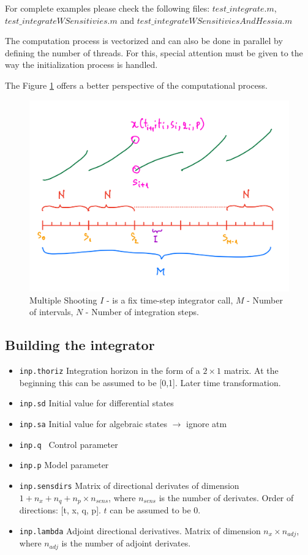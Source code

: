 \documentclass[12pt, letterpaper]{article}
\begin{document}
For complete examples please check the following files: $test\_integrate.m$, $test\_integrateWSensitivies.m$ and
$test\_integrateWSensitiviesAndHessia.m$

The computation process is vectorized and can also be done in parallel by defining the number of threads. For this, special attention must be given to the way the initialization process is handled.

The Figure \ref{multipleShootingImg} offers a better perspective of the computational process.

\begin{figure}[h!]
    \centering
    \includegraphics[scale=0.25]{images/multipleShooting.png}
    \caption{Multiple Shooting $I$ - is a fix time-step integrator call, $M$ - Number of intervals, $N$ - Number of integration steps.}
    \label{multipleShootingImg}
\end{figure}



\subsection{Building the integrator}

\begin{itemize}
    \item \texttt{inp.thoriz} Integration horizon in the form of a $2 \times 1$ matrix. At the beginning  this can be assumed to be [0,1]. Later time transformation.
    \item \texttt{inp.sd} Initial value for differential states 
    \item \texttt{inp.sa} Initial value for algebraic states $\rightarrow$ ignore atm
    \item \texttt{inp.q } Control parameter
    \item \texttt{inp.p} Model parameter
    \item \texttt{inp.sensdirs} Matrix of directional derivates of dimension $1+n_x+n_q+n_p \times n_{sens}$, where $n_{sens}$ is the number of derivates.
         Order of directions: [t, x, q, p]. $t$ can be assumed to be 0.
    \item \texttt{inp.lambda} Adjoint directional derivatives. 
           Matrix of dimension $n_x \times n_{adj}$, where $n_{adj}$ is the number of adjoint derivates.
\end{itemize}
\end{document}

